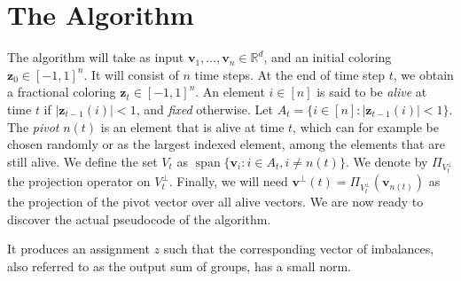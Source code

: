 \documentclass[12pt]{article}
\DeclareMathOperator{\Span}{span}
\begin{document}
\section{The Algorithm}
The algorithm will take as input $\textbf{v}_1,\ldots,\textbf{v}_n\in\mathbb{R}^d$, and an initial coloring $\textbf{z}_0\in[-1,1]^n$. It will consist of $n$ time steps. At the end of time step $t$, we obtain a fractional coloring $\textbf{z}_t\in[-1,1]^n$. An element $i \in [n]$ is said to be \textit{alive} at time $t$ if $|\textbf{z}_{t-1}(i)|<1$, and \textit{fixed} otherwise. Let $A_t=\{i\in[n]:|\textbf{z}_{t-1}(i)|<1\}$. The \textit{pivot} $n(t)$ is an element that is alive at time $t$, which can for example be chosen randomly or as the largest indexed element, among the elements that are still alive. We define the set $V_t$ as $\Span\{\textbf{v}_i:i\in A_t,i\not=n(t)\}$. We denote by $\Pi_{V_t^\perp}$ the projection operator on $V_t^\perp$. Finally, we will need $\textbf{v}^{\perp}(t)=\Pi_{V_t^\perp}(\textbf{v}_{n(t)})$ as the projection of the pivot vector over all alive vectors. We are now ready to discover the actual pseudocode of the algorithm.

It produces an assignment $z$ such that the corresponding vector of imbalances, also referred to as the output sum of groups, has a small norm.
\end{document}
